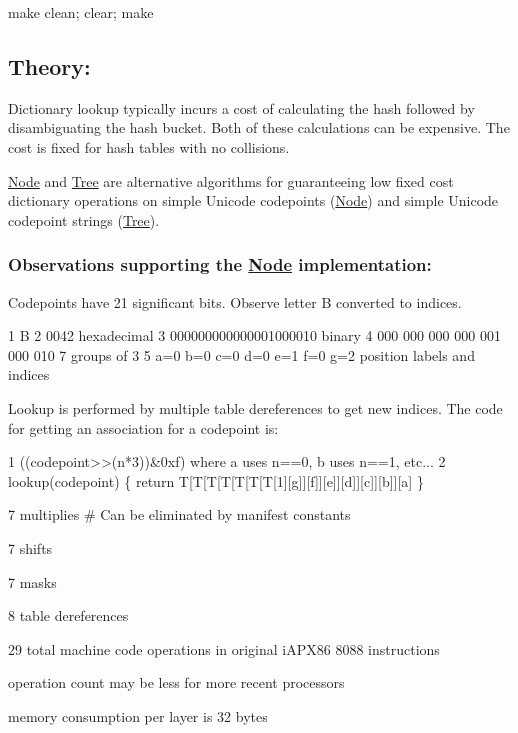 \begin{DoxyItemize}
\item make clean; clear; make
\end{DoxyItemize}

\subsection*{Theory\+:}

Dictionary lookup typically incurs a cost of calculating the hash followed by disambiguating the hash bucket. Both of these calculations can be expensive. The cost is fixed for hash tables with no collisions.

\hyperlink{class_node}{Node} and \hyperlink{class_tree}{Tree} are alternative algorithms for guaranteeing low fixed cost dictionary operations on simple Unicode codepoints (\hyperlink{class_node}{Node}) and simple Unicode codepoint strings (\hyperlink{class_tree}{Tree}).

\subsubsection*{Observations supporting the \hyperlink{class_node}{Node} implementation\+:}

Codepoints have 21 significant bits. Observe letter B converted to indices. 
\begin{DoxyCode}
1 B
2 0042                          hexadecimal
3 000000000000001000010         binary
4 000 000 000 000 001 000 010   7 groups of 3
5 a=0 b=0 c=0 d=0 e=1 f=0 g=2   position labels and indices
\end{DoxyCode}


Lookup is performed by multiple table dereferences to get new indices. The code for getting an association for a codepoint is\+: 
\begin{DoxyCode}
1 ((codepoint>>(n*3))&0xf) where a uses n==0, b uses n==1, etc...
2 lookup(codepoint) \{ return T[T[T[T[T[T[T[1][g]][f]][e]][d]][c]][b]][a] \}
\end{DoxyCode}

\begin{DoxyItemize}
\item 7 multiplies \# Can be eliminated by manifest constants
\item 7 shifts
\item 7 masks
\item 8 table dereferences
\item 29 total machine code operations in original i\+A\+P\+X86 8088 instructions
\item operation count may be less for more recent processors
\item memory consumption per layer is 32 bytes
\end{DoxyItemize}

